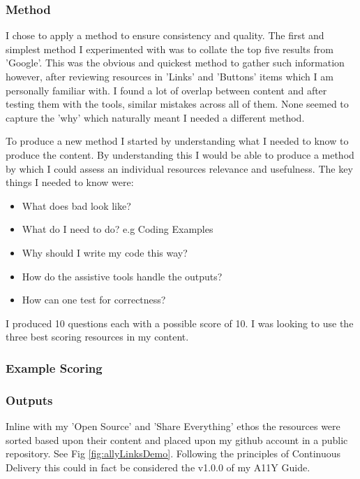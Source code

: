 \subsubsection{Method}
I chose to apply a method to ensure consistency and quality. The first and
simplest method I experimented with was to collate the top five results from
'Google'. This was the obvious and quickest method to gather such information
however, after reviewing resources in 'Links' and 'Buttons' items which I am
personally familiar with. I found a lot of overlap between content and after
testing them with the tools, similar mistakes across all of them.
None seemed to capture the 'why' which naturally meant I needed a
different method.

To produce a new method I started by understanding what I needed to know to
produce the content. By understanding this I would be able to produce a method
by which I could assess an individual resources relevance and usefulness. The
key things I needed to know were:

\begin {itemize}
\item What does bad look like?
\item What do I need to do? e.g Coding Examples
\item Why should I write my code this way?
\item How do the assistive tools handle the outputs?
\item How can one test for correctness?
\end{itemize}

I produced 10 questions each with a possible score of 10. I was looking to
use the three best scoring resources in my content.

\subsubsection{Example Scoring}


\subsubsection{Outputs}
Inline with my 'Open Source' and 'Share Everything' ethos the resources were
sorted based upon their content and placed upon my github account in a public
 repository.
See Fig \ref{fig:allyLinksDemo}.
Following the principles of Continuous Delivery this could in fact be
considered the v1.0.0 of my A11Y Guide.

